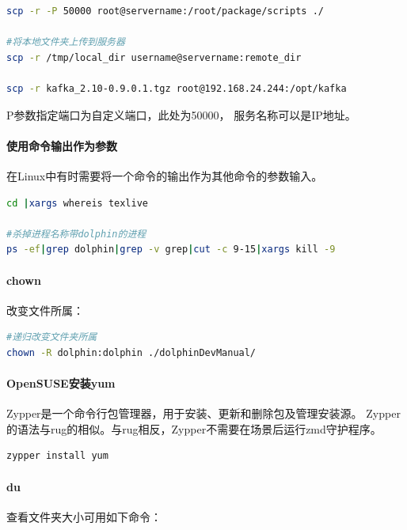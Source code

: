 \documentclass{book}
\begin{document}
\begin{lstlisting}[language=Bash]
scp -r -P 50000 root@servername:/root/package/scripts ./

#将本地文件夹上传到服务器
scp -r /tmp/local_dir username@servername:remote_dir

scp -r kafka_2.10-0.9.0.1.tgz root@192.168.24.244:/opt/kafka
\end{lstlisting}

P参数指定端口为自定义端口，此处为50000，
服务名称可以是IP地址。

\paragraph{使用命令输出作为参数}

在Linux中有时需要将一个命令的输出作为其他命令的参数输入。

\begin{lstlisting}[language=Bash]
cd |xargs whereis texlive

#杀掉进程名称带dolphin的进程
ps -ef|grep dolphin|grep -v grep|cut -c 9-15|xargs kill -9
\end{lstlisting}

\paragraph{chown}

改变文件所属：

\begin{lstlisting}[language=Bash]
#递归改变文件夹所属
chown -R dolphin:dolphin ./dolphinDevManual/
\end{lstlisting}

\paragraph{OpenSUSE安装yum}

Zypper是一个命令行包管理器，用于安装、更新和删除包及管理安装源。
Zypper的语法与rug的相似。与rug相反，Zypper不需要在场景后运行zmd守护程序。

\begin{lstlisting}[language=Bash]
zypper install yum
\end{lstlisting}

\paragraph{du}

查看文件夹大小可用如下命令：
\end{document}

